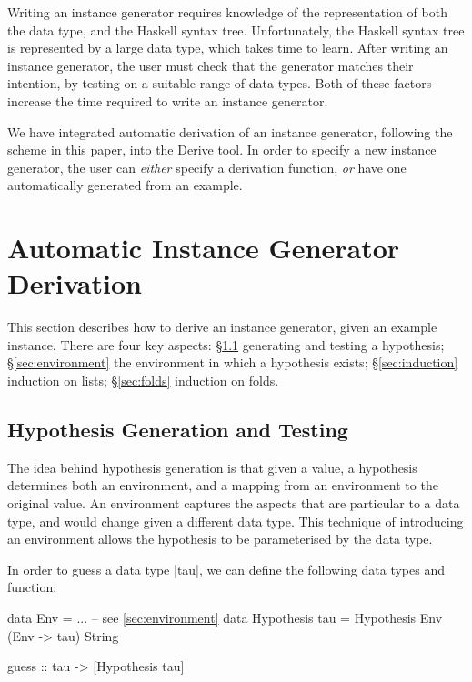 \documentclass{llncs}
\begin{document}
Writing an instance generator requires knowledge of the representation of both the data type, and the Haskell syntax tree. Unfortunately, the Haskell syntax tree is represented by a large data type, which takes time to learn. After writing an instance generator, the user must check that the generator matches their intention, by testing on a suitable range of data types. Both of these factors increase the time required to write an instance generator.

We have integrated automatic derivation of an instance generator, following the scheme in this paper, into the Derive tool. In order to specify a new instance generator, the user can \textit{either} specify a derivation function, \textit{or} have one automatically generated from an example.


\section{Automatic Instance Generator Derivation}
\label{sec:automatic_instances}

This section describes how to derive an instance generator, given an example instance. There are four key aspects: \S\ref{sec:generation} generating and testing a hypothesis; \S\ref{sec:environment} the environment in which a hypothesis exists; \S\ref{sec:induction} induction on lists; \S\ref{sec:folds} induction on folds.

\subsection{Hypothesis Generation and Testing}
\label{sec:generation}

The idea behind hypothesis generation is that given a value, a hypothesis determines both an environment, and a mapping from an environment to the original value. An environment captures the aspects that are particular to a data type, and would change given a different data type. This technique of introducing an environment allows the hypothesis to be parameterised by the data type.

In order to guess a data type |tau|, we can define the following data types and function:

\begin{code}
data Env = ... -- see \ref{sec:environment}
data Hypothesis tau = Hypothesis Env (Env -> tau) String

guess :: tau -> [Hypothesis tau]
\end{code}
\end{document}
